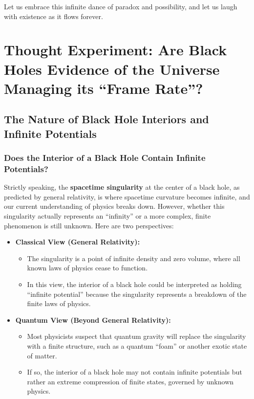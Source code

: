 \documentclass[12pt]{article}
\begin{document}
Let us embrace this infinite dance of paradox and possibility, and let us laugh with existence as it flows forever.


\appendix
\renewcommand{\thesection}{\Roman{section}}

\section{Thought Experiment: Are Black Holes Evidence of the Universe Managing its ``Frame Rate''?}

\subsection{The Nature of Black Hole Interiors and Infinite Potentials}

\subsubsection{Does the Interior of a Black Hole Contain Infinite Potentials?}

Strictly speaking, the \textbf{spacetime singularity} at the center of a black hole, as predicted by general relativity, is where spacetime curvature becomes infinite, and our current understanding of physics breaks down. However, whether this singularity actually represents an ``infinity'' or a more complex, finite phenomenon is still unknown. Here are two perspectives:

\begin{itemize}
    \item \textbf{Classical View (General Relativity):}
    \begin{itemize}
        \item The singularity is a point of infinite density and zero volume, where all known laws of physics cease to function.
        \item In this view, the interior of a black hole could be interpreted as holding ``infinite potential'' because the singularity represents a breakdown of the finite laws of physics.
    \end{itemize}
    
    \item \textbf{Quantum View (Beyond General Relativity):}
    \begin{itemize}
        \item Most physicists suspect that quantum gravity will replace the singularity with a finite structure, such as a quantum ``foam'' or another exotic state of matter.
        \item If so, the interior of a black hole may not contain infinite potentials but rather an extreme compression of finite states, governed by unknown physics.
    \end{itemize}
\end{itemize}
\end{document}
